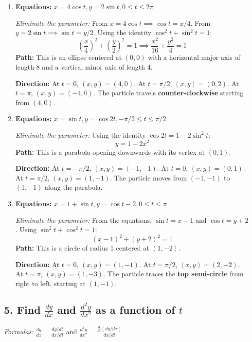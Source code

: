 \documentclass[12pt]{article}
\newcommand{\questiontitle}[1]{\subsection*{#1}}
\begin{document}
\begin{enumerate}[label=\alph*.]
    \item \textbf{Equations:} $x=4\cos t, y=2\sin t, 0 \le t \le 2\pi$
    
    \textit{Eliminate the parameter:}
    From $x=4\cos t \implies \cos t = x/4$. From $y=2\sin t \implies \sin t = y/2$.
    Using the identity $\cos^2 t + \sin^2 t = 1$:
    $$ \left(\frac{x}{4}\right)^2 + \left(\frac{y}{2}\right)^2 = 1 \implies \frac{x^2}{16} + \frac{y^2}{4} = 1 $$
    \textbf{Path:} This is an ellipse centered at $(0,0)$ with a horizontal major axis of length 8 and a vertical minor axis of length 4.
    
    \textbf{Direction:} At $t=0$, $(x,y)=(4,0)$. At $t=\pi/2$, $(x,y)=(0,2)$. At $t=\pi$, $(x,y)=(-4,0)$. The particle travels \textbf{counter-clockwise} starting from $(4,0)$.

    \item \textbf{Equations:} $x=\sin t, y=\cos 2t, -\pi/2 \le t \le \pi/2$
    
    \textit{Eliminate the parameter:}
    Using the identity $\cos 2t = 1-2\sin^2 t$:
    $$ y = 1 - 2x^2 $$
    \textbf{Path:} This is a parabola opening downwards with its vertex at $(0,1)$.
    
    \textbf{Direction:} At $t=-\pi/2$, $(x,y)=(-1,-1)$. At $t=0$, $(x,y)=(0,1)$. At $t=\pi/2$, $(x,y)=(1,-1)$. The particle moves from $(-1,-1)$ to $(1,-1)$ along the parabola.
    
    \item \textbf{Equations:} $x=1+\sin t, y=\cos t-2, 0 \le t \le \pi$
    
    \textit{Eliminate the parameter:}
    From the equations, $\sin t = x-1$ and $\cos t = y+2$.
    Using $\sin^2 t + \cos^2 t = 1$:
    $$ (x-1)^2 + (y+2)^2 = 1 $$
    \textbf{Path:} This is a circle of radius 1 centered at $(1,-2)$.
    
    \textbf{Direction:} At $t=0$, $(x,y)=(1,-1)$. At $t=\pi/2$, $(x,y)=(2,-2)$. At $t=\pi$, $(x,y)=(1,-3)$. The particle traces the \textbf{top semi-circle} from right to left, starting at $(1,-1)$.
\end{enumerate}

\newpage
\questiontitle{5. Find $\frac{dy}{dx}$ and $\frac{d^2y}{dx^2}$ as a function of $t$}

\textit{Formulas:} $\frac{dy}{dx} = \frac{dy/dt}{dx/dt}$ and $\frac{d^2y}{dx^2} = \frac{\frac{d}{dt}(dy/dx)}{dx/dt}$
\end{document}
